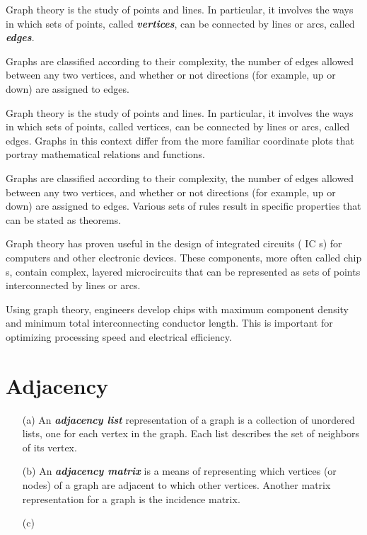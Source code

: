 \documentclass[]{report}
\begin{document}
Graph theory is the study of points and lines. In particular, it involves the ways in which sets of points, called \textit{\textbf{vertices}}, can be connected by lines or arcs, called \textit{\textbf{edges}}.

Graphs are classified according to their complexity, the number of edges allowed between any two vertices, and whether or not directions (for example, up or down) are assigned to edges. 




\newpage
Graph theory is the study of points and lines. In particular, it involves the ways in which sets of points, called vertices, can be connected by lines or arcs, called edges. Graphs in this context differ from the more familiar coordinate plots that portray mathematical relations and functions.

Graphs are classified according to their complexity, the number of edges allowed between any two vertices, and whether or not directions (for example, up or down) are assigned to edges. Various sets of rules result in specific properties that can be stated as theorems.

Graph theory has proven useful in the design of integrated circuits ( IC s) for computers and other electronic devices. These components, more often called chip s, contain complex, layered microcircuits that can be represented as sets of points interconnected by lines or arcs. 

Using graph theory, engineers develop chips with maximum component density and minimum total interconnecting conductor length. This is important for optimizing processing speed and electrical efficiency.
\section*{Adjacency}
\begin{itemize}

\item[(a)] An \textit{\textbf{adjacency list}} representation of a graph is a collection of unordered lists, one for each vertex in the graph. Each list describes the set of neighbors of its vertex.

\item[(b)] An \textit{\textbf{adjacency matrix}} is a means of representing which vertices (or nodes) of a graph are adjacent to which other vertices. Another matrix representation for a graph is the incidence matrix.

\item[(c)]

\end{itemize}
\end{document}
